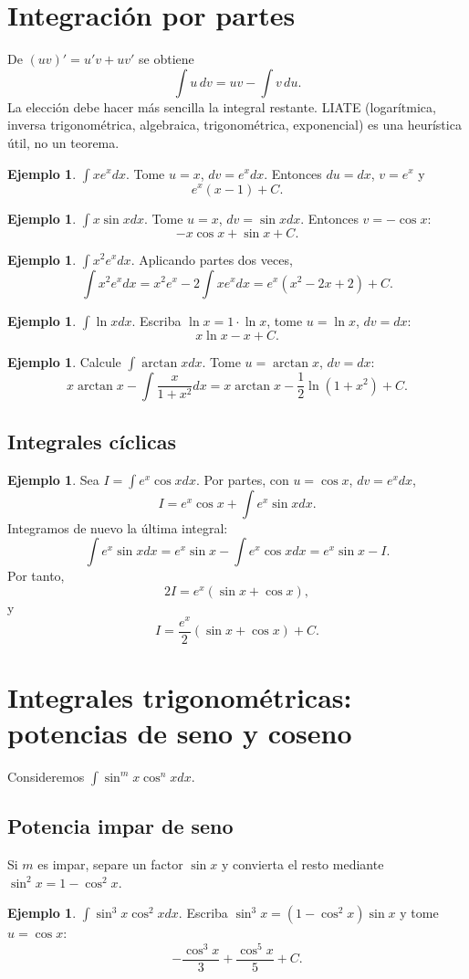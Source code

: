 \documentclass[12pt]{article}
\theoremstyle{definition}
\newtheorem{ejemplo}[teorema]{Ejemplo}
\theoremstyle{remark}
\begin{document}
\section{Integración por partes}
De $(uv)'=u'v+uv'$ se obtiene
\[\boxed{\int u\,dv=uv-\int v\,du}.\]
La elección debe hacer más sencilla la integral restante. LIATE (logarítmica, inversa trigonométrica, algebraica, trigonométrica, exponencial) es una heurística útil, no un teorema.
\begin{ejemplo}$\int xe^xdx$. Tome $u=x$, $dv=e^xdx$. Entonces $du=dx$, $v=e^x$ y
\[\boxed{e^x(x-1)+C}.\]\end{ejemplo}
\begin{ejemplo}$\int x\sin xdx$. Tome $u=x$, $dv=\sin xdx$. Entonces $v=-\cos x$:
\[\boxed{-x\cos x+\sin x+C}.\]\end{ejemplo}
\begin{ejemplo}$\int x^2e^xdx$. Aplicando partes dos veces,
\[\int x^2e^xdx=x^2e^x-2\int xe^xdx=\boxed{e^x(x^2-2x+2)+C}.\]\end{ejemplo}
\begin{ejemplo}$\int\ln xdx$. Escriba $\ln x=1\cdot\ln x$, tome $u=\ln x$, $dv=dx$:
\[\boxed{x\ln x-x+C}.\]\end{ejemplo}
\begin{ejemplo}Calcule $\int\arctan xdx$. Tome $u=\arctan x$, $dv=dx$:
\[x\arctan x-\int\frac{x}{1+x^2}dx=\boxed{x\arctan x-\frac12\ln(1+x^2)+C}.\]\end{ejemplo}
\subsection*{Integrales cíclicas}
\begin{ejemplo}Sea $I=\int e^x\cos xdx$. Por partes, con $u=\cos x$, $dv=e^xdx$,
\[I=e^x\cos x+\int e^x\sin xdx.\]
Integramos de nuevo la última integral:
\[\int e^x\sin xdx=e^x\sin x-\int e^x\cos xdx=e^x\sin x-I.\]
Por tanto,
\[2I=e^x(\sin x+\cos x),\]
y
\[\boxed{I=\frac{e^x}{2}(\sin x+\cos x)+C}.\]\end{ejemplo}

\section{Integrales trigonométricas: potencias de seno y coseno}
Consideremos $\int\sin^m x\cos^n xdx$.
\subsection*{Potencia impar de seno}
Si $m$ es impar, separe un factor $\sin x$ y convierta el resto mediante $\sin^2x=1-\cos^2x$.
\begin{ejemplo}$\int\sin^3x\cos^2x dx$. Escriba $\sin^3x=(1-\cos^2x)\sin x$ y tome $u=\cos x$:
\[\boxed{-\frac{\cos^3x}{3}+\frac{\cos^5x}{5}+C}.\]\end{ejemplo}
\end{document}
